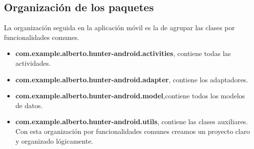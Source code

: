 \subsection{Organización de los paquetes}
La organización seguida en la aplicación móvil es la de agrupar las clases por funcionalidades comunes.
\begin{itemize}
\item  \textbf{com.example.alberto.hunter-android.activities}, contiene todas las actividades.
\item \textbf{com.example.alberto.hunter-android.adapter}, contiene los adaptadores.
\item \textbf{com.example.alberto.hunter-android.model},contiene todos los modelos de datos.
\item \textbf{com.example.alberto.hunter-android.utils}, contiene las clases auxiliares.\\ 

Con esta organización por funcionalidades comunes creamos un proyecto claro y  organizado lógicamente.

\end{itemize}



